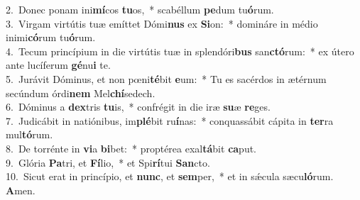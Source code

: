 {2.~}Donec ponam ini\textbf{mí}cos \textbf{tu}os,~* scabéllum \textbf{pe}dum tu\textbf{ó}rum.\\
{3.~}Virgam virtútis tuæ emíttet Dómi\textbf{nus} ex \textbf{Si}on:~* domináre in médio inimi\textbf{có}rum tu\textbf{ó}rum.\\
{4.~}Tecum princípium in die virtútis tuæ in splendóri\textbf{bus} san\textbf{ctó}rum:~* ex útero ante lucíferum \textbf{gé}nu\textbf{i} te.\\
{5.~}Jurávit Dóminus, et non pœni\textbf{té}bit \textbf{e}um:~* Tu es sacérdos in ætérnum secúndum órdi\textbf{nem} Mel\textbf{chí}sedech.\\
{6.~}Dóminus a \textbf{dex}tris \textbf{tu}is,~* confrégit in die iræ \textbf{su}æ \textbf{re}ges.\\
{7.~}Judicábit in natiónibus, im\textbf{plé}bit ru\textbf{í}nas:~* conquassábit cápita in \textbf{ter}ra mul\textbf{tó}rum.\\
{8.~}De torrénte in \textbf{vi}a \textbf{bi}bet:~* proptérea exal\textbf{tá}bit \textbf{ca}put.\\
{9.~}Glória \textbf{Pa}tri, et \textbf{Fí}lio,~* et Spi\textbf{rí}tui \textbf{San}cto.\\
{10.~}Sicut erat in princípio, et \textbf{nunc}, et \textbf{sem}per,~* et in sǽcula sæcu\textbf{ló}rum. \textbf{A}men.\\
